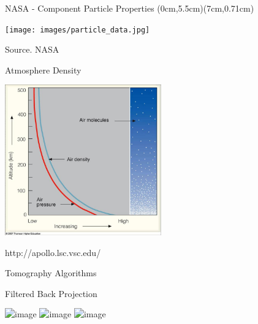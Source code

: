 \documentclass[compress,red,12pt]{beamer}
\begin{document}

\begin{frame}[label=particle-type]{NASA - Component Particle Properties}
  (0cm,5.5cm)(7cm,0.71cm)
  \begin{center}
    \texttt{[image: images/particle\_data.jpg]}
  \end{center}    
  \hfill{\tiny Source. NASA}\hyperlink{settings<5>}{}
\end{frame}

\begin{frame}[label=air-density]{Atmosphere Density}
  \begin{center}
    \includegraphics[height=6.5cm]{images/vert_dist.jpg}
  \end{center}    
  \begin{flushright}
    {\tiny http://apollo.lsc.vsc.edu/}  \hyperlink{settings<4>}{}
  \end{flushright}
\end{frame}


\begin{frame}[label=tomo-algo]{Tomography Algorithms}
  \begin{block}{Filtered Back Projection}
  \end{block}

  \begin{center}
    \includegraphics<1>[height=6.5cm]{images/radon.jpg}
    \includegraphics<2>[height=6.5cm]{images/radon_inv.jpg}
    \includegraphics<3>[height=6.5cm]{images/radon_inv_filt.jpg}
  \end{center}
\end{frame}
\end{document}
